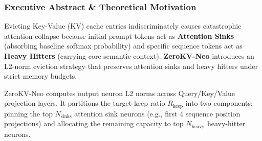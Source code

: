 \subsubsection*{Executive Abstract \& Theoretical Motivation}

Evicting Key-Value (KV) cache entries indiscriminately causes catastrophic attention collapse because initial prompt tokens act as \textbf{Attention Sinks} (absorbing baseline softmax probability) and specific sequence tokens act as \textbf{Heavy Hitters} (carrying core semantic context). \textbf{ZeroKV-Neo} introduces an L2-norm eviction strategy that preserves attention sinks and heavy hitters under strict memory budgets.

ZeroKV-Neo computes output neuron L2 norms across Query/Key/Value projection layers. It partitions the target keep ratio $R_{\text{keep}}$ into two components: pinning the top $N_{\text{sinks}}$ attention sink neurons (e.g., first 4 sequence position projections) and allocating the remaining capacity to top $N_{\text{heavy}}$ heavy-hitter neurons.

